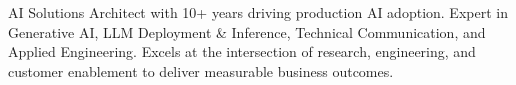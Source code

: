 

\begin{cvparagraph}

AI Solutions Architect with 10+ years driving production AI adoption. Expert in Generative AI, LLM Deployment \& Inference, Technical Communication, and Applied Engineering. Excels at the intersection of research, engineering, and customer enablement to deliver measurable business outcomes.

\end{cvparagraph}
